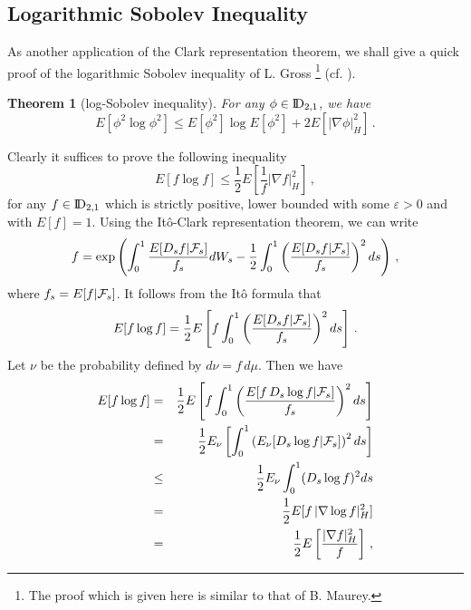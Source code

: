 \documentclass[12pt,a4paper]{book}
\newtheorem{theorem}{Theorem}[section]
\newcommand{\beaa}{\begin{eqnarray*}}
\newcommand{\eeaa}{\end{eqnarray*}}
\newcommand{\eps}{\varepsilon}
\newcommand{\DD}{{\rm I\!D}}
\newcommand{\calF}{{\cal F}}
\newcommand{\proof}{\noindent {\bf Proof:\ }}
\begin{document}
\subsection{Logarithmic Sobolev Inequality}
As another application  of the Clark representation theorem, we shall
give a quick proof of the logarithmic Sobolev inequality of L. Gross
{\footnote {The  proof which is given here  is similar  to that of 
    B. Maurey.}} (cf. \cite{LG}).
\begin{theorem}[log-Sobolev inequality]
For any $\phi\in \DD_{2,1}$, we have
$$
E[\phi^2\log \phi^2]\leq E[\phi^2]\log E[\phi^2]+2E[|\nabla
\phi|_H^2]\,.
$$
\end{theorem}
\proof
Clearly it suffices to prove the following inequality 
$$
E[f\log f]\leq \frac{1}{2}E\left[\frac{1}{f}|\nabla f|_H^2\right]\,,
$$
for any $f\in \DD_{2,1}$ which is strictly positive, lower bounded
with some $\eps>0$ and  with $E[f]=1$. Using
the It\^o-Clark representation theorem, we can write 
$$
f=\exp\left(\int_0^1\frac{E[D_sf|\calF_s]}{f_s}dW_s-\frac{1}{2}\int_0^1\left(\frac{E[D_sf|\calF_s]}{f_s}\right)^2ds\right)\,,
$$
where $f_s=E[f|\calF_s]$. It follows from the It\^o formula that 
$$
E[f\log
f]=\frac{1}{2}E\left[f\int_0^1\left(\frac{E[D_sf|\calF_s]}{f_s}\right)^2
ds\right]\,.
$$
Let $\nu$ be the probability defined by $d\nu=f\,d\mu$. Then we have 
\beaa
E[f\log f]&=&\frac{1}{2}E\left[f\int_0^1\left(\frac{E[f\,D_s\log
      f|\calF_s]}{f_s}\right)^2 ds\right]\\
&=&\frac{1}{2}E_\nu\left[\int_0^1 \left(E_\nu[D_s\log
      f|\calF_s]\right)^2 ds\right]\\
&\leq&\frac{1}{2}E_\nu\int_0^1(D_s\log f)^2ds\\
&=&\frac{1}{2}E[f\,|\nabla\log f|_H^2]\\
&=&\frac{1}{2}E\left[\frac{|\nabla f|_H^2}{f}\right]\,,
\eeaa

\end{document}
